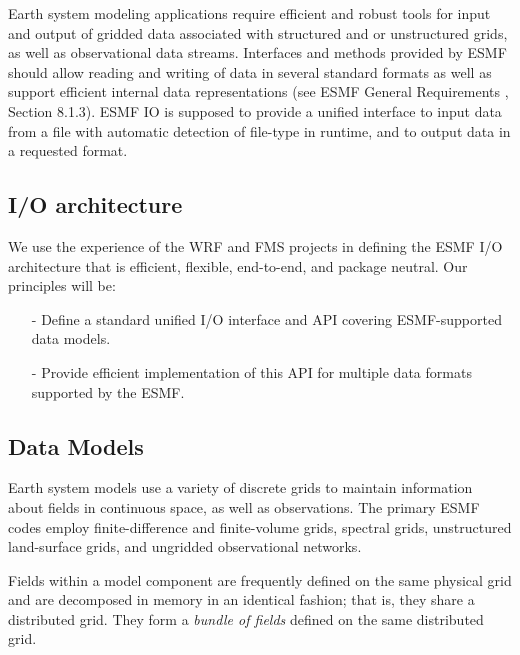 

Earth system modeling applications require efficient and robust tools
for input and output of gridded data associated with
structured and or unstructured grids, as well as observational data streams.
Interfaces and methods provided by ESMF should allow reading and
writing of data in several standard formats as well as support
efficient internal data representations (see ESMF General
Requirements \cite{ESMFGenReq}, Section 8.1.3). ESMF IO is supposed to
provide a unified interface to input data from a file with automatic 
detection of file-type in runtime, and to output data in a requested format.

\subsection{I/O architecture}

We use the experience of the WRF \cite{WRF-Software} and FMS 
\cite{Balaji_Parallel_IO_2000}  projects in defining the 
ESMF I/O architecture that is efficient, flexible, end-to-end, and package 
neutral. Our principles will be:

\begin{itemize}
\item[-] Define a standard unified I/O interface and API covering 
         ESMF-supported data models.
\item[-] Provide efficient implementation of this API for multiple data 
         formats supported by the ESMF. 
\end{itemize}



\subsection{Data Models}

Earth system models use a variety of discrete grids to maintain information 
about fields in continuous space, as well as observations. The primary ESMF 
codes employ finite-difference and finite-volume grids, spectral grids, 
unstructured land-surface grids, and ungridded observational networks.

Fields within a model component are frequently defined on the same
physical grid and are decomposed in memory in an identical fashion;
that is, they share a distributed grid. They form a {\em bundle of
fields} defined on the same distributed grid. 

